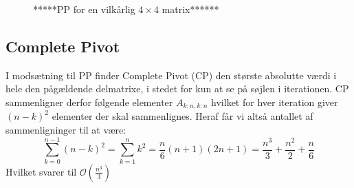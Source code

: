 \documentclass{article}
\begin{document}
\begin{figure}
\caption{*****PP for en vilkårlig $4 \times 4$ matrix******}
\label{fig:partial}
\end{figure}


\subsection{Complete Pivot}
I modsætning til PP finder Complete Pivot (CP) den største absolutte værdi i hele den pågældende delmatrixe, i stedet for kun at se på søjlen i iterationen. CP sammenligner derfor følgende elementer $A_{k:n, k:n}$ hvilket for hver iteration giver $(n - k)^2$ elementer der skal sammenlignes. Heraf får vi altså antallet af sammenligninger til at være:
\[
\sum\limits_{k=0}^{n-1} \left(n-k\right)^2 = \sum\limits_{k=1}^{n} k^2 = \frac{n}{6}(n+1)(2n+1) = \frac{n^3}{3}+\frac{n^2}{2}+\frac{n}{6}
\]
Hvilket svarer til $\mathcal{O}(\frac{n^3}{3})$ \vspace{\baselineskip}
\end{document}
